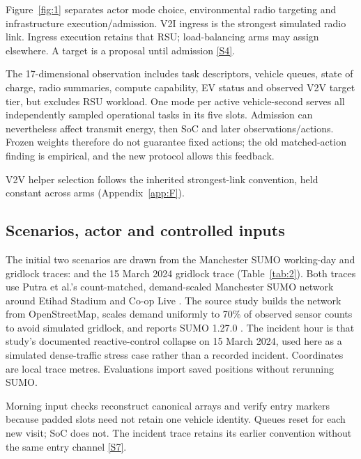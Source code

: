 \documentclass[12pt,a4paper]{article}
\begin{document}
Figure~\ref{fig:1} separates actor mode choice, environmental radio targeting and infrastructure execution/admission. V2I ingress is the strongest simulated radio link. Ingress execution retains that RSU; load-balancing arms may assign elsewhere. A target is a proposal until admission \hyperref[source-s4]{[S4]}.

The 17-dimensional observation includes task descriptors, vehicle queues, state of charge, radio summaries, compute capability, EV status and observed V2V target tier, but excludes RSU workload. One mode per active vehicle-second serves all independently sampled operational tasks in its five slots. Admission can nevertheless affect transmit energy, then SoC and later observations/actions. Frozen weights therefore do not guarantee fixed actions; the old matched-action finding is empirical, and the new protocol allows this feedback.

V2V helper selection follows the inherited strongest-link convention, held constant across arms (Appendix~\ref{app:F}).

\FloatBarrier
\subsection{Scenarios, actor and controlled inputs}\label{sec:2.3}

The initial two scenarios are drawn from the Manchester SUMO working-day and gridlock traces:  and the 15 March 2024 gridlock trace (Table~\ref{tab:2}). Both traces use Putra et al.'s count-matched, demand-scaled Manchester SUMO network around Etihad Stadium and Co-op Live \cite{ref47}. The source study builds the network from OpenStreetMap, scales demand uniformly to 70\% of observed sensor counts to avoid simulated gridlock, and reports SUMO 1.27.0 \cite{ref47}. The incident hour is that study's documented reactive-control collapse on 15 March 2024, used here as a simulated dense-traffic stress case rather than a recorded incident. Coordinates are local trace metres. Evaluations import saved positions without rerunning SUMO.

Morning input checks reconstruct canonical arrays and verify entry markers because padded slots need not retain one vehicle identity. Queues reset for each new visit; SoC does not. The incident trace retains its earlier convention without the same entry channel \hyperref[source-s7]{[S7]}.
\end{document}
